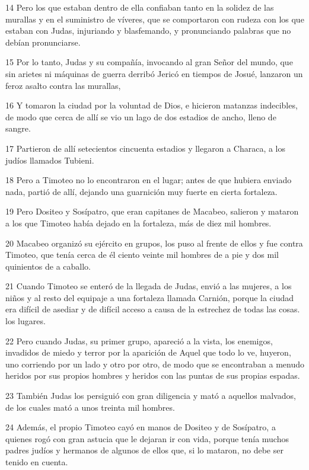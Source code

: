 \par 14 Pero los que estaban dentro de ella confiaban tanto en la solidez de las murallas y en el suministro de víveres, que se comportaron con rudeza con los que estaban con Judas, injuriando y blasfemando, y pronunciando palabras que no debían pronunciarse.
\par 15 Por lo tanto, Judas y su compañía, invocando al gran Señor del mundo, que sin arietes ni máquinas de guerra derribó Jericó en tiempos de Josué, lanzaron un feroz asalto contra las murallas,
\par 16 Y tomaron la ciudad por la voluntad de Dios, e hicieron matanzas indecibles, de modo que cerca de allí se vio un lago de dos estadios de ancho, lleno de sangre.
\par 17 Partieron de allí setecientos cincuenta estadios y llegaron a Characa, a los judíos llamados Tubieni.
\par 18 Pero a Timoteo no lo encontraron en el lugar; antes de que hubiera enviado nada, partió de allí, dejando una guarnición muy fuerte en cierta fortaleza.
\par 19 Pero Dositeo y Sosípatro, que eran capitanes de Macabeo, salieron y mataron a los que Timoteo había dejado en la fortaleza, más de diez mil hombres.
\par 20 Macabeo organizó su ejército en grupos, los puso al frente de ellos y fue contra Timoteo, que tenía cerca de él ciento veinte mil hombres de a pie y dos mil quinientos de a caballo.
\par 21 Cuando Timoteo se enteró de la llegada de Judas, envió a las mujeres, a los niños y al resto del equipaje a una fortaleza llamada Carnión, porque la ciudad era difícil de asediar y de difícil acceso a causa de la estrechez de todas las cosas. los lugares.
\par 22 Pero cuando Judas, su primer grupo, apareció a la vista, los enemigos, invadidos de miedo y terror por la aparición de Aquel que todo lo ve, huyeron, uno corriendo por un lado y otro por otro, de modo que se encontraban a menudo heridos por sus propios hombres y heridos con las puntas de sus propias espadas.
\par 23 También Judas los persiguió con gran diligencia y mató a aquellos malvados, de los cuales mató a unos treinta mil hombres.
\par 24 Además, el propio Timoteo cayó en manos de Dositeo y de Sosípatro, a quienes rogó con gran astucia que le dejaran ir con vida, porque tenía muchos padres judíos y hermanos de algunos de ellos que, si lo mataron, no debe ser tenido en cuenta.
